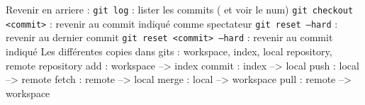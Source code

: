 \documentclass{article}
\begin{document}
    \noindent Revenir en arriere : \bigbreak
    \noindent\texttt{git log} : lister les commits ( et voir le num) \smallbreak
    \noindent\texttt{git checkout <commit>} : revenir au commit indiqué comme spectateur \smallbreak
    \noindent\texttt{git reset --hard} : revenir au dernier commit \smallbreak
    \noindent\texttt{git reset <commit> --hard} : revenir au commit indiqué \bigbreak
    \noindent Les différentes copies dans gits : \bigbreak
    \noindent workspace, index, local repository, remote repository \bigbreak
    \noindent add : workspace --> index \smallbreak
    \noindent commit : index --> local \smallbreak
    \noindent push : local --> remote \smallbreak
    \noindent fetch : remote --> local \smallbreak
    \noindent merge : local --> workspace \smallbreak
    \noindent pull : remote --> workspace
\end{document}
